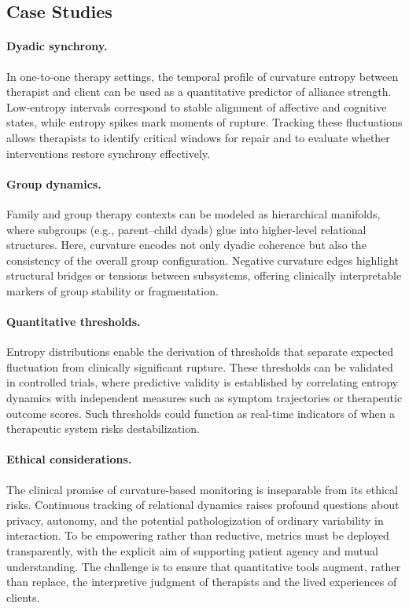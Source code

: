 \documentclass{article}
\theoremstyle{definition}
\begin{document}
\subsection{Case Studies}

\paragraph{Dyadic synchrony.}  
In one-to-one therapy settings, the temporal profile of curvature entropy
between therapist and client can be used as a quantitative predictor of
alliance strength. Low-entropy intervals correspond to stable alignment of
affective and cognitive states, while entropy spikes mark moments of rupture.
Tracking these fluctuations allows therapists to identify critical windows for
repair and to evaluate whether interventions restore synchrony effectively.

\paragraph{Group dynamics.}  
Family and group therapy contexts can be modeled as hierarchical manifolds,
where subgroups (e.g., parent–child dyads) glue into higher-level relational
structures. Here, curvature encodes not only dyadic coherence but also the
consistency of the overall group configuration. Negative curvature edges
highlight structural bridges or tensions between subsystems, offering
clinically interpretable markers of group stability or fragmentation.

\paragraph{Quantitative thresholds.}  
Entropy distributions enable the derivation of thresholds that separate
expected fluctuation from clinically significant rupture. These thresholds can
be validated in controlled trials, where predictive validity is established by
correlating entropy dynamics with independent measures such as symptom
trajectories or therapeutic outcome scores. Such thresholds could function as
real-time indicators of when a therapeutic system risks destabilization.

\paragraph{Ethical considerations.}  
The clinical promise of curvature-based monitoring is inseparable from its
ethical risks. Continuous tracking of relational dynamics raises profound
questions about privacy, autonomy, and the potential pathologization of
ordinary variability in interaction. To be empowering rather than reductive,
metrics must be deployed transparently, with the explicit aim of supporting
patient agency and mutual understanding. The challenge is to ensure that
quantitative tools augment, rather than replace, the interpretive judgment of
therapists and the lived experiences of clients.
\end{document}
